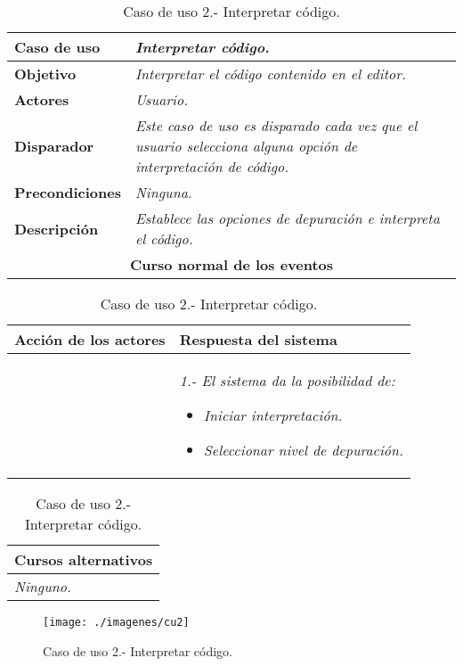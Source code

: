    \begin{table}[!ht] %
      \centering
      \begin{tabular}{|p{4cm}|p{11.5cm}|}
      \hline
      \textbf{Caso de uso} & \textit{Interpretar código.}\\ \hline
      \textbf{Objetivo} & \textit{Interpretar el código contenido en el editor.}\\ \hline
      \textbf{Actores} & \textit{Usuario.}\\ \hline
      \textbf{Disparador} & \textit{Este caso de uso es disparado cada vez que el usuario selecciona alguna opción de interpretación de código.}\\ \hline
      \textbf{Precondiciones} & \textit{Ninguna.}\\ \hline
      \textbf{Descripción} & \textit{Establece las opciones de depuración e interpreta el código.}\\ \hline
      \multicolumn{2}{|c|}{\textbf{Curso normal de los eventos}}\\ \hline
    \end{tabular}
    \begin{tabular}{|p{7.75cm}|p{7.75cm}|}
      \hspace{2cm}\textbf{Acción de los actores} & \hspace{1.75cm}\textbf{Respuesta del sistema}\\ \hline
            & \textit{1.- El sistema da la posibilidad de:}
               \begin{itemize}
                  \item \textit{Iniciar interpretación.}
                  \item \textit{Seleccionar nivel de depuración.}
               \end{itemize} \\ \hline
    \end{tabular}
    \begin{tabular}{|p{15.9cm}|}
      \hspace{6cm}\textbf{Cursos alternativos}\\ \hline
      \textit{Ninguno.}\\ \hline
    \end{tabular}
    \caption{Caso de uso 2.- Interpretar código.}
   \end{table}

   \begin{figure} [H] \begin{center}
      \texttt{[image: ./imagenes/cu2]}\label{cu2}
      \caption{Caso de uso 2.- Interpretar código.}
   \end{center} \end{figure}


